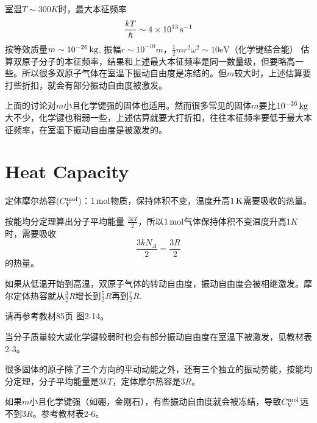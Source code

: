 \documentclass[CJK]{beamer}
\begin{document}
\begin{frame}
\bch
{室温$T\sim 300K$时，最大本征频率
$$ \frac{kT}{\hbar} \sim 4 \times 10^{13} \,\mathrm{s}^{-1}  $$
  按等效质量$m\sim 10^{-26}\,\mathrm{kg}$, 振幅$r\sim 10^{-10}m$，$\frac{1}{2}mr^2\omega^2\sim 10\mathrm{eV}$（化学键结合能） 估算双原子分子的本征频率，结果和上述最大本征频率是同一数量级，但要略高一些。所以{\blue 很多双原子气体在室温下振动自由度是冻结的}。但$m$较大时，上述估算要打些折扣，就会有部分振动自由度被激发。

  \skiplines
  
  上面的讨论对$m$小且化学键强的固体也适用。然而很多常见的固体$m$要比$10^{-26}\,\mathrm{kg}$大不少，化学键也稍弱一些，上述估算就要大打折扣，往往本征频率要低于最大本征频率，在室温下振动自由度是被激发的。
}

\ech
\end{frame}

\section{Heat Capacity}


\begin{frame}
\bch
    {\large
      {\blue 定体摩尔热容($C_V^{\rm mol}$)：$1\,\mathrm{mol}$物质，保持体积不变，温度升高$1\,\mathrm{K}$需要吸收的热量。}

      \skipline
      
      按能均分定理算出分子平均能量 $\frac{3kT}{2}$，所以$1\,\mathrm{mol}$气体保持体积不变温度升高$1K$时，需要吸收
      $$ \frac{3kN_A}{2} = \frac{3R}{2}$$
      的热量。
}
\ech
\end{frame}


\begin{frame}
\bch
如果从低温开始到高温，双原子气体的转动自由度，振动自由度会被相继激发。摩尔定体热容就从$\frac{3}{2}R$增长到$\frac{5}{2}R$再到$\frac{7}{2}R$.


请再参考教材85页 图2-14。

当分子质量较大或化学键较弱时也会有部分振动自由度在室温下被激发，见教材表2-3。
\ech
\end{frame}



\begin{frame}
\bch
    {\large

      很多固体的原子除了三个方向的平动动能之外，还有三个独立的振动势能，按能均分定理，分子平均能量是$3kT$，定体摩尔热容是$3R$。

    \skipline
    
    如果$m$小且化学键强（如硼，金刚石），有些振动自由度就会被冻结，导致$C_V^{\rm mol}$远不到$3R$。参考教材表2-6。

}
\ech
\end{frame}
\end{document}
